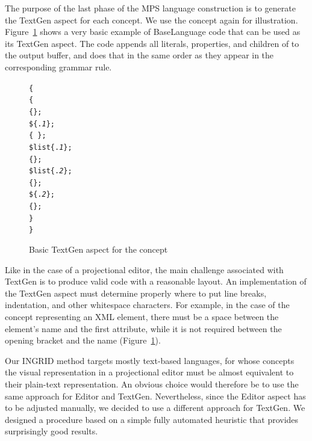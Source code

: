 The purpose of the last phase of the MPS language construction is to generate the TextGen aspect for each concept.
We use the  concept again for illustration.
Figure~\ref{fig:TEXTGENBASIC} shows a very basic example of BaseLanguage code that can be used as its TextGen aspect.
The code appends all literals, properties, and children of  to the output buffer, and does that in the same order as they appear in the corresponding grammar rule.

\begin{figure}[ht]
\begin{alltt}
\small
{}  \{
   \{
     \{\mpstgliteral{<}\};
     \$\{.\textit{1}\};
     \{\ \};
     \$list\{.\textit{1}\};
     \{\mpstgliteral{>}\};
     \$list\{.\textit{2}\};
     \{\mpstgliteral{</}\};
     \$\{.\textit{2}\};
     \{\mpstgliteral{>}\};
  \}
\}
\end{alltt}
\caption{Basic TextGen aspect for the  concept}
\label{fig:TEXTGENBASIC}
\end{figure}

Like in the case of a projectional editor, the main challenge associated with TextGen is to produce valid code with a reasonable layout.
An implementation of the TextGen aspect must determine properly where to put line breaks, indentation, and other whitespace characters.
For example, in the case of the concept representing an XML element, there must be a space between the element's name and the first attribute, while it is not required between the opening bracket \antlrliteral{\textless} and the name (Figure~\ref{fig:TEXTGENBASIC}).

Our INGRID method targets mostly text-based languages, for whose concepts the visual representation in a projectional editor must be almost equivalent to their plain-text representation.
An obvious choice would therefore be to use the same approach for Editor and TextGen.
Nevertheless, since the Editor aspect has to be adjusted manually, we decided to use a different approach for TextGen.
We designed a procedure based on a simple fully automated heuristic that provides surprisingly good results.

